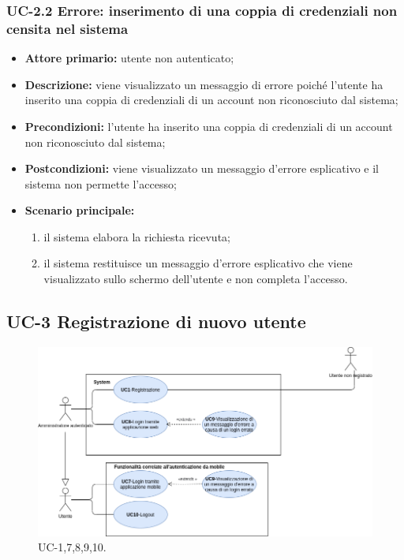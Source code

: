 \subsubsection{UC-2.2 Errore: inserimento di una coppia di credenziali non censita nel sistema}
\begin{itemize}
	\item \textbf{Attore primario:} utente non autenticato;

	\item \textbf{Descrizione:} viene visualizzato un messaggio di errore poiché l'utente ha inserito una coppia di credenziali di un account non riconosciuto dal sistema;

	\item \textbf{Precondizioni:} l'utente ha inserito una coppia di credenziali di un account non riconosciuto dal sistema;

	\item \textbf{Postcondizioni:} viene visualizzato un messaggio d'errore esplicativo e il sistema non permette l'accesso;

	\item \textbf{Scenario principale:}
	      \begin{enumerate}
		      \item il sistema elabora la richiesta ricevuta;
		      \item il sistema restituisce un messaggio d'errore esplicativo che viene visualizzato sullo schermo dell'utente e non completa l'accesso.
	      \end{enumerate}
\end{itemize}


\subsection{UC-3 Registrazione di nuovo utente}
\begin{figure}[H]
	\centering
	\includegraphics[width=\textwidth]{src/CasiDUso/immagini/Autenticazione.png}
	\caption{UC-1,7,8,9,10.}
\end{figure}

